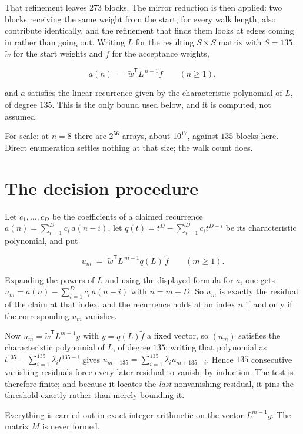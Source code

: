 \documentclass[11pt]{article}
\theoremstyle{definition}
\begin{document}
That refinement leaves $273$ blocks. The mirror reduction is then applied: two blocks receiving the same weight from the start, for every walk length, also contribute identically, and the refinement that finds them looks at edges coming in rather than going out. Writing $L$ for the resulting $S \times S$ matrix with $S = 135$, $\tilde w$ for the start weights and $\tilde f$ for the acceptance weights,

\[a(n) \;=\; \tilde w^{\mathsf T} L^{\,n-1} \tilde f \qquad (n \ge 1),\]

and $a$ satisfies the linear recurrence given by the characteristic polynomial of $L$, of degree $135$. This is the only bound used below, and it is computed, not assumed.

For scale: at $n = 8$ there are $2^{56}$ arrays, about $10^{17}$, against $135$ blocks here. Direct enumeration settles nothing at that size; the walk count does.

\section{The decision procedure}

Let $c_1,\dots,c_D$ be the coefficients of a claimed recurrence $a(n) = \sum_{i=1}^{D} c_i\,a(n-i)$, let $q(t) = t^{D} - \sum_{i=1}^{D} c_i t^{D-i}$ be its characteristic polynomial, and put

\[u_m \;=\; \tilde w^{\mathsf T} L^{\,m-1} q(L)\,\tilde f \qquad (m \ge 1).\]

Expanding the powers of $L$ and using the displayed formula for $a$, one gets $u_m = a(n) - \sum_{i=1}^{D} c_i\,a(n-i)$ with $n = m + D$. So $u_m$ is exactly the residual of the claim at that index, and the recurrence holds at an index $n$ if and only if the corresponding $u_m$ vanishes.

Now $u_m = \tilde w^{\mathsf T} L^{m-1} y$ with $y = q(L)\tilde f$ a fixed vector, so $(u_m)$ satisfies the characteristic polynomial of $L$, of degree $135$: writing that polynomial as $t^{135} - \sum_{i=1}^{135} \lambda_i t^{135-i}$ gives $u_{m+135} = \sum_{i=1}^{135} \lambda_i u_{m+135-i}$. Hence $135$ consecutive vanishing residuals force every later residual to vanish, by induction. The test is therefore finite; and because it locates the {\itshape last} nonvanishing residual, it pins the threshold exactly rather than merely bounding it.

Everything is carried out in exact integer arithmetic on the vector $L^{m-1}y$. The matrix $M$ is never formed.
\end{document}
